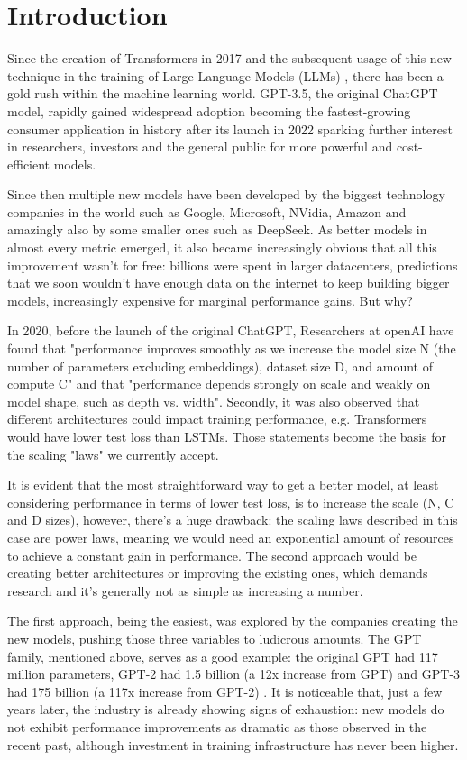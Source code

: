 \section{Introduction}

Since the creation of Transformers in 2017 \cite{Vaswani2017} and the subsequent usage of this new technique in the training of Large Language Models (LLMs) , there has been a gold rush within the machine learning world. GPT-3.5, the original ChatGPT model, rapidly gained widespread adoption becoming the fastest-growing consumer application in history after its launch in 2022 \cite{ChatGPTAdoption2022} sparking further interest in researchers, investors and the general public for more powerful and cost-efficient models. 

Since then multiple new models have been developed by the biggest technology companies in the world such as Google, Microsoft, NVidia, Amazon and amazingly also by some smaller ones such as DeepSeek. As better models in almost every metric emerged, it also became increasingly obvious that all this improvement wasn’t for free: billions were spent in larger datacenters, predictions that we soon wouldn’t have enough data on the internet to keep building bigger models, increasingly expensive for marginal performance gains. But why?

In 2020, before the launch of the original ChatGPT, Researchers at openAI \cite{Kaplan2020} have found that "performance improves smoothly as we increase the model size N (the number of parameters excluding embeddings), dataset size D, and amount of compute C" and that "performance depends strongly on scale and weakly on model shape, such as depth vs. width". Secondly, it was also observed that different architectures could impact training performance, e.g. Transformers would have lower test loss than LSTMs. Those statements become the basis for the scaling "laws" we currently accept.

It is evident that the most straightforward way to get a better model, at least considering performance in terms of lower test loss, is to increase the scale (N, C and D sizes), however, there’s a huge drawback: the scaling laws described in this case are power laws, meaning we would need an exponential amount of resources to achieve a constant gain in performance. The second approach would be creating better architectures or improving the existing ones, which demands research and it’s generally not as simple as increasing a number.

The first approach, being the easiest, was explored by the companies creating the new models, pushing those three variables to ludicrous amounts. The GPT family, mentioned above, serves as a good example: the original GPT had 117 million parameters, GPT-2 had 1.5 billion (a 12x increase from GPT) and GPT-3 had 175 billion (a 117x increase from GPT-2) \cite{Brown2020} \cite{Radford2019} \cite{Radford2018}. It is noticeable that, just a few years later, the industry is already showing signs of exhaustion: new models do not exhibit performance improvements as dramatic as those observed in the recent past, although investment in training infrastructure has never been higher.

